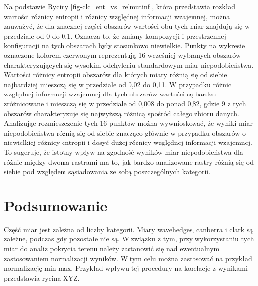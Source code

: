 \documentclass{amuthesis}
\begin{document}
Na podstawie Ryciny \ref{fig-clc_ent_vs_relmutinf}, która przedstawia
rozkład wartości różnicy entropii i różnicy względnej informacji
wzajemnej, można zauważyć, że dla znacznej części obszarów wartości obu
tych miar znajdują się w przedziale od 0 do 0,1. Oznacza to, że zmiany
kompozycji i przestrzennej konfiguracji na tych obszarach były
stosunkowo niewielkie. Punkty na wykresie oznaczone kolorem czerwonym
reprezentują 16 wcześniej wybranych obszarów charakteryzujących się
wysokim odchyleniu standardowym miar niepodobieństwa. Wartości różnicy
entropii obszarów dla których miary różnią się od siebie najbardziej
mieszczą się w przedziale od 0,02 do 0,11. W przypadku różnic względnej
informacji wzajemnej dla tych obszarów wartości są bardzo zróżnicowane i
mieszczą się w przedziale od 0,008 do ponad 0,82, gdzie 9 z tych
obszarów charakteryzuje się najwyższą różnicą spośród całego zbioru
danych. Analizując rozmieszczenie tych 16 punktów można wywnioskować, że
wyniki miar niepodobieństwa różnią się od siebie znacząco głównie w
przypadku obszarów o niewielkiej różnicy entropii i dosyć dużej różnicy
względnej informacji wzajemnej. To sugeruje, że istotny wpływ na
zgodność wyników miar niepodobieństwa dla różnic między dwoma rastrami
ma to, jak bardzo analizowane rastry różnią się od siebie pod względem
sąsiadowania ze sobą poszczególnych kategorii.


\hypertarget{sec-podsumowanie}{%
\chapter{Podsumowanie}\label{sec-podsumowanie}}

Część miar jest zależna od liczby kategorii. Miary wavehedges, canberra
i clark są zależne, podczas gdy pozostałe nie są. W związku z tym, przy
wykorzystaniu tych miar do analiz pokrycia terenu należy zastanowić się
nad ewentualnym zastosowaniem normalizacji wyników. W tym celu można
zastosować na przykład normalizację min-max. Przykład wpływu tej
procedury na korelacje z wynikami przedstawia rycina XYZ.

\printbibliography[heading=bibintoc, title=Bibliografia]
\end{document}
